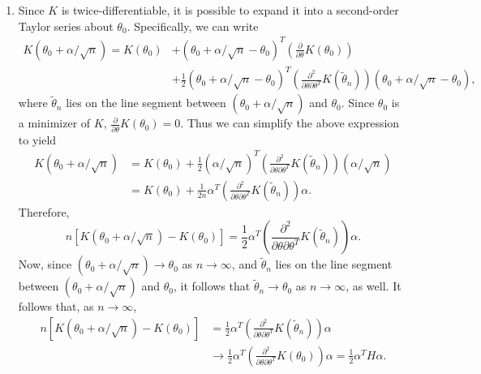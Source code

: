 \documentclass[12pt]{article}
\begin{document}
\begin{enumerate}
\item
Since $K$ is twice-differentiable, it is possible to expand it into a second-order Taylor series about $\theta_0$. Specifically, we can write
\begin{align*}
K(\theta_0 + \alpha/\sqrt{n}) = K(\theta_0) &+ (\theta_0 + \alpha/\sqrt{n} - \theta_0)^T \left(\frac{\partial}{\partial \theta} K(\theta_0)\right) \\
&+ \frac{1}{2}(\theta_0 + \alpha/\sqrt{n} - \theta_0)^T \left(\frac{\partial^2}{\partial \theta \partial \theta^T} K(\tilde{\theta}_n)\right) (\theta_0 + \alpha/\sqrt{n} - \theta_0),
\end{align*}
where $\tilde{\theta}_n$ lies on the line segment between $(\theta_0 + \alpha/\sqrt{n})$ and $\theta_0$. Since $\theta_0$ is a minimizer of $K$, $\frac{\partial}{\partial \theta} K(\theta_0) = 0$. Thus we can simplify the above expression to yield
\begin{align*}
K(\theta_0 + \alpha/\sqrt{n}) &= K(\theta_0) + \frac{1}{2}(\alpha/\sqrt{n})^T \left(\frac{\partial^2}{\partial \theta \partial \theta^T} K(\tilde{\theta}_n)\right) (\alpha/\sqrt{n}) \\
&= K(\theta_0) + \frac{1}{2n}\alpha^T \left(\frac{\partial^2}{\partial \theta \partial \theta^T} K(\tilde{\theta}_n)\right) \alpha.
\end{align*}
Therefore,
\begin{equation*}
n[K(\theta_0 + \alpha/\sqrt{n}) - K(\theta_0)] = \frac{1}{2}\alpha^T \left(\frac{\partial^2}{\partial \theta \partial \theta^T} K(\tilde{\theta}_n)\right) \alpha.
\end{equation*}
Now, since $(\theta_0 + \alpha/\sqrt{n}) \to \theta_0$ as $n \to \infty$, and $\tilde{\theta}_n$ lies on the line segment between $(\theta_0 + \alpha/\sqrt{n})$ and $\theta_0$, it follows that $\tilde{\theta}_n \to \theta_0$ as $n \to \infty$, as well. It follows that, as $n \to \infty$,
\begin{align*}
n[K(\theta_0 + \alpha/\sqrt{n}) - K(\theta_0)] &= \frac{1}{2}\alpha^T \left(\frac{\partial^2}{\partial \theta \partial \theta^T} K(\tilde{\theta}_n)\right) \alpha \\
&\to \frac{1}{2}\alpha^T \left(\frac{\partial^2}{\partial \theta \partial \theta^T} K(\theta_0)\right) \alpha = \frac{1}{2} \alpha^T H \alpha.
\end{align*}


\end{enumerate}
\end{document}
